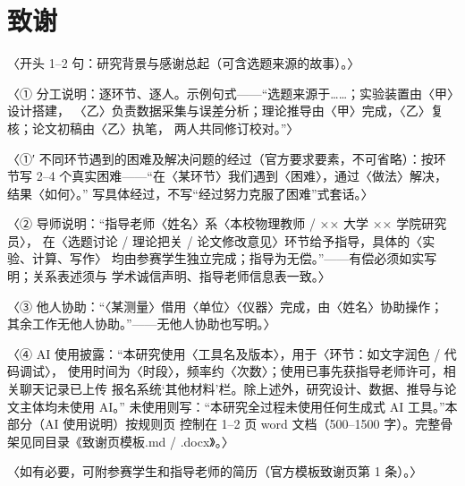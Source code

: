 \documentclass[12pt, a4paper]{article}
\begin{document}
\section*{致谢}

〈开头 1--2 句：研究背景与感谢总起（可含选题来源的故事）。〉

〈① 分工说明：逐环节、逐人。示例句式——“选题来源于……；实验装置由〈甲〉设计搭建，
〈乙〉负责数据采集与误差分析；理论推导由〈甲〉完成，〈乙〉复核；论文初稿由〈乙〉执笔，
两人共同修订校对。”〉

〈①′ 不同环节遇到的困难及解决问题的经过（官方要求要素，不可省略）：按环节写
2--4 个真实困难——“在〈某环节〉我们遇到〈困难〉，通过〈做法〉解决，结果〈如何〉。”
写具体经过，不写“经过努力克服了困难”式套话。〉

〈② 导师说明：“指导老师〈姓名〉系〈本校物理教师 / ×× 大学 ×× 学院研究员〉，
在〈选题讨论 / 理论把关 / 论文修改意见〉环节给予指导，具体的〈实验、计算、写作〉
均由参赛学生独立完成；指导为无偿。”——有偿必须如实写明；关系表述须与
学术诚信声明、指导老师信息表一致。〉

〈③ 他人协助：“〈某测量〉借用〈单位〉〈仪器〉完成，由〈姓名〉协助操作；
其余工作无他人协助。”——无他人协助也写明。〉

〈④ AI 使用披露：“本研究使用〈工具名及版本〉，用于〈环节：如文字润色 / 代码调试〉，
使用时间为〈时段〉，频率约〈次数〉；使用已事先获指导老师许可，相关聊天记录已上传
报名系统‘其他材料’栏。除上述外，研究设计、数据、推导与论文主体均未使用 AI。”
未使用则写：“本研究全过程未使用任何生成式 AI 工具。”本部分（AI 使用说明）按规则页
控制在 1--2 页 word 文档（500--1500 字）。完整骨架见同目录《致谢页模板.md / .docx》。〉

〈如有必要，可附参赛学生和指导老师的简历（官方模板致谢页第 1 条）。〉
\end{document}
